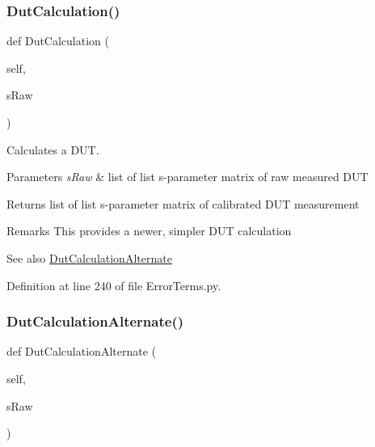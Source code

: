 \subsubsection{\texorpdfstring{Dut\+Calculation()}{DutCalculation()}}
{\footnotesize\ttfamily def Dut\+Calculation (\begin{DoxyParamCaption}\item[{}]{self,  }\item[{}]{s\+Raw }\end{DoxyParamCaption})}



Calculates a D\+UT. 


\begin{DoxyParams}{Parameters}
{\em s\+Raw} & list of list s-\/parameter matrix of raw measured D\+UT \\
\hline
\end{DoxyParams}
\begin{DoxyReturn}{Returns}
list of list s-\/parameter matrix of calibrated D\+UT measurement 
\end{DoxyReturn}
\begin{DoxyRemark}{Remarks}
This provides a newer, simpler D\+UT calculation 
\end{DoxyRemark}
\begin{DoxySeeAlso}{See also}
\hyperlink{classSignalIntegrity_1_1Measurement_1_1Calibration_1_1ErrorTerms_1_1ErrorTerms_aaa197534b553fe80ed41db445147cbc3}{Dut\+Calculation\+Alternate} 
\end{DoxySeeAlso}


Definition at line 240 of file Error\+Terms.\+py.

\mbox{\label{classSignalIntegrity_1_1Measurement_1_1Calibration_1_1ErrorTerms_1_1ErrorTerms_aaa197534b553fe80ed41db445147cbc3}} 
\subsubsection{\texorpdfstring{Dut\+Calculation\+Alternate()}{DutCalculationAlternate()}}
{\footnotesize\ttfamily def Dut\+Calculation\+Alternate (\begin{DoxyParamCaption}\item[{}]{self,  }\item[{}]{s\+Raw }\end{DoxyParamCaption})}



